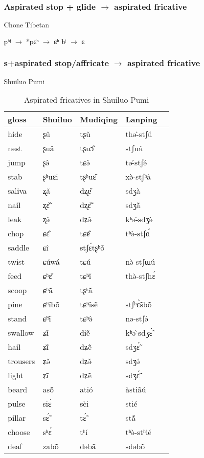 \documentclass[oldfontcommands,oneside,a4paper,11pt]{article}
\newcommand{\ipa}[1]{{\phon \mbox{#1}}} %
\begin{document}
\subsubsection{Aspirated stop + glide $\rightarrow$ aspirated fricative}
Chone Tibetan
\begin{exe}
\ex 
\glt *pʰʲ $\rightarrow$ *pɕʰ $\rightarrow$ ɕʰ
\glt *bʲ $\rightarrow$ ɕ  
\end{exe}

\subsubsection{s+aspirated stop/affricate $\rightarrow$ aspirated fricative}
Shuiluo Pumi

\begin{table}[h]
\caption{Aspirated fricatives in Shuiluo Pumi}  
\centering
\begin{tabular}{lllll}
\toprule
gloss & 	Shuiluo & 	Mudiqing & 	Lanping \\ 	
\midrule
hide & 	\ipa{ʂû} & 	\ipa{tʂǔ} & 	\ipa{thə-̀stʃú} \\ 	
nest & 	\ipa{ʂuâ} & 	\ipa{tʂuɔ̂} & 	\ipa{stʃuá} \\ 	
jump & 	\ipa{ʂə̂} & 	\ipa{tɕə̂} & 	\ipa{tə-́stʃə́} \\ 	
stab & 	\ipa{ʂʰuɛi} & 	\ipa{tʂʰuɛ̌} & 	\ipa{xə̀-stʃʰà} \\ 	
saliva & 	\ipa{ʐǎ} & 	\ipa{dʐɐ̌} & 	\ipa{sdʒà} \\ 	
nail & 	\ipa{ʐɛ̃̌} & 	\ipa{dʐɛ̃̌} & 	\ipa{sdʒã̀} \\ 	
leak & 	\ipa{ʐə̌} & 	\ipa{dʑə̌} & 	\ipa{kʰə-̀sdʒə̀} \\ 	
chop & 	\ipa{ɕɛ̂} & 	\ipa{tɕɐ̂} & 	\ipa{tʰə̀-stʃɑ́} \\ 	
saddle & 	\ipa{ɕî} & 	\ipa{stʃɛ́tʂʰṍ} & 	\ipa{} \\ 	
twist & 	\ipa{ɕúwá} & 	\ipa{tɕú} & 	\ipa{nə̀-stʃɯú} \\ 	
feed & 	\ipa{ɕʰɛ̌} & 	\ipa{tɕʰǐ} & 	\ipa{thə̀-stʃhɛ́} \\ 	
scoop & 	\ipa{ɕʰã̌} & 	\ipa{tʂʰã̌} & 	\ipa{} \\ 	
pine & 	\ipa{ɕʰĩbṍ} & 	\ipa{tɕʰĩsẽ́} & 	\ipa{stʃʰɛ̃̀sbṍ} \\ 	
stand & 	\ipa{ɕʰĩ̌} & 	\ipa{tɕʰə̂} & 	\ipa{nə-stʃə́} \\ 	
swallow & 	\ipa{ʑĩ̂} & 	\ipa{diẽ̂} & 	\ipa{kʰə-̀sdʒɛ̃́} \\ 	
hail & 	\ipa{ʑĩ̌} & 	\ipa{dʑẽ̂} & 	\ipa{sdʒɛ̃́} \\ 	
trousers & 	\ipa{ʑə̌} & 	\ipa{dʑə̌} & 	\ipa{sdʒə́} \\ 	
light & 	\ipa{ʑĩ̌} & 	\ipa{dʑẽ̌} & 	\ipa{sdʒɛ̃́} \\ 	
beard & 	\ipa{asṍ} & 	\ipa{atió} & 	\ipa{àstiãú} \\ 	
pulse & 	\ipa{siɛ́} & 	\ipa{sèi} & 	\ipa{stié} \\ 	
pillar & 	\ipa{sɛ̃́} & 	\ipa{tɛ̃́} & 	\ipa{stã́} \\ 	
choose & 	\ipa{sʰɛ́} & 	\ipa{tʰí} & 	\ipa{tʰə̀-stʰié} \\ 	
deaf & 	\ipa{zabõ̌} & 	\ipa{dəbã̌} & 	\ipa{sdəbõ̀} \\ 	
\bottomrule
\end{tabular}
\end{table}
\end{document}
